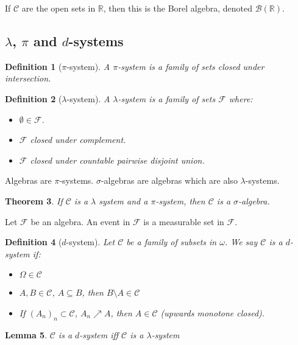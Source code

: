 \documentclass{article}
\newtheorem{theorem}{Theorem}
\newtheorem{lemma}[theorem]{Lemma}
\newtheorem{definition}[theorem]{Definition}
\theoremstyle{definition}
\numberwithin{theorem}{section}
\numberwithin{equation}{section}
\begin{document}
If $\mathcal{C}$ are the open sets in $\mathbb{R}$, then this is the Borel algebra, denoted $\mathcal{B}(\mathbb{R})$.

\subsection{$\lambda$, $\pi$ and $d$-systems}
\begin{definition}[$\pi$-system]
	A $\pi$-system is a family of sets closed under intersection.
\end{definition}

\begin{definition}[$\lambda$-system]
	A $\lambda$-system is a family of sets $\mathcal{F}$ where:
\begin{itemize}
	\item $\emptyset \in \mathcal{F}$.
	\item $\mathcal{F}$ closed under complement.
	\item $\mathcal{F}$ closed under countable pairwise disjoint union.
\end{itemize}
\end{definition}

Algebras are $\pi$-systems. $\sigma$-algebras are algebras which are also $\lambda$-systems.
\begin{theorem}
	If $\mathcal{C}$ is a $\lambda$ system and a $\pi$-system, then $\mathcal{C}$ is a $\sigma$-algebra.
\end{theorem}
Let $\mathcal{F}$ be an algebra. An event in $\mathcal{F}$ is a measurable set in $\mathcal{F}$. 

\begin{definition}[$d$-system]
	Let $\mathcal{C}$ be a family of subsets in $\omega$. We say $\mathcal{C}$ is a $d$-system if:

\begin{itemize}
	\item $\Omega \in \mathcal{C}$
	\item $A, B \in \mathcal{C}$, $A \subseteq B$, then $B \setminus A \in \mathcal{C}$
	\item If $(A_n)_n \subset \mathcal{C}$, $A_n \nearrow A$, then $A \in \mathcal{C}$ (upwards monotone closed). 
\end{itemize}
\end{definition}

\begin{lemma}
	$\mathcal{C}$ is a $d$-system iff $\mathcal{C}$ is a $\lambda$-system
\end{lemma}
\end{document}
